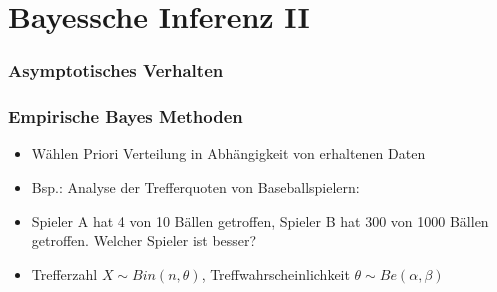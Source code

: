 \documentclass[aspectratio=169,xcolor=dvipsnames]{beamer}
\begin{document}
\section{Bayessche Inferenz II}

\begin{frame}
\frametitle{Asymptotisches Verhalten}
\end{frame}

\begin{frame}
\frametitle{Empirische Bayes Methoden}
\begin{itemize}
	\item<1-> Wählen Priori Verteilung in Abhängigkeit von erhaltenen Daten
	\item<2-> Bsp.: Analyse der Trefferquoten von Baseballspielern:
	\item<3-> Spieler A hat 4 von 10 Bällen getroffen, Spieler B hat 300 von 1000 Bällen getroffen. Welcher Spieler ist besser?
	\item<4-> Trefferzahl $X\sim Bin(n,\theta)$, Treffwahrscheinlichkeit $\theta\sim Be(\alpha,\beta)$
\end{itemize}
\end{frame}
\end{document}
